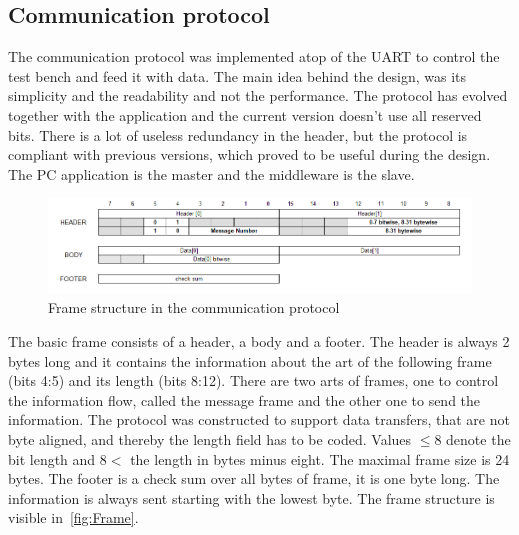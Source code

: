 \subsection{Communication protocol}
The communication protocol was implemented atop of the UART to control the test bench and feed it with data. The main idea behind the design, was its simplicity and the readability and not the performance. The protocol has evolved together with the application and the current version doesn't use all reserved bits. There is a lot of useless redundancy in the header, but the protocol is compliant with previous versions, which proved to be useful during the design. The PC application is the master and the middleware is the slave.

\begin{figure}[H]
\centering
\includegraphics[width=\textwidth]{figures/SerialFrame.png}
\caption{Frame structure in the communication protocol}
\label{fig:Frame}
\end{figure}

The basic frame consists of a header, a body and a footer. The header is always 2 bytes long and it contains the information about the art of the following frame (bits 4:5) and its length (bits 8:12). There are two arts of frames, one to control the information flow, called the message frame and the other one to send the information. The protocol was constructed to support data transfers, that are not byte aligned, and thereby the length field has to be coded. Values $\leq 8$ denote the bit length and $8 <$ the length in bytes minus eight. The maximal frame size is 24 bytes. The footer is a check sum over all bytes of frame, it is one byte long. The information is always sent starting with the lowest byte. The frame structure is visible in~\autoref{fig:Frame}.

